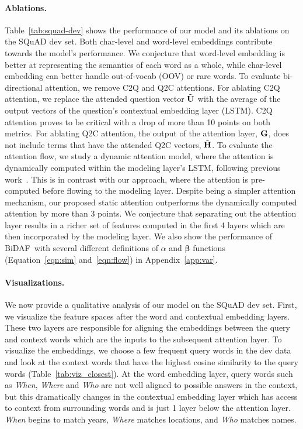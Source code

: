\documentclass{article} \usepackage{iclr2017_conference,times}
\newcommand{\sysshort}{\mbox{\sc BiDAF}}
\begin{document}
\paragraph{Ablations.} Table~\ref{tab:squad-dev} shows the performance of our model and its ablations on the SQuAD dev set. Both char-level and word-level embeddings contribute towards the model's performance. We conjecture that word-level embedding is better at representing the semantics of each word as a whole, while char-level embedding can better handle out-of-vocab (OOV) or rare words. To evaluate bi-directional attention, we remove C2Q and Q2C attentions. For ablating C2Q attention, we replace the attended question vector $\tilde{\bf U}$ with the average of the output vectors of the question's contextual embedding layer (LSTM). C2Q attention proves to be critical with a drop of more than 10 points on both metrics. For ablating Q2C attention, the output of the attention layer, ${\bf G}$, does not include terms that have the attended Q2C vectors, $\tilde{\bf H}$. To evaluate the attention flow, we study a dynamic attention model, where the attention is dynamically computed within the modeling layer's LSTM, following previous work~\citep{Bahdanau2014NeuralMT,wang2016machine}. This is in contrast with our approach, where the attention is pre-computed before flowing to the modeling layer. Despite being a simpler attention mechanism, our proposed static attention outperforms the dynamically computed attention by more than 3 points. We conjecture that separating out the attention layer results in a richer set of features computed in the first 4 layers which are then incorporated by the modeling layer.
We also show the performance of \sysshort\ with several different definitions of $\alpha$ and ${\bm \beta}$ functions (Equation~\ref{eqn:sim} and~\ref{eqn:flow}) in Appendix~\ref{app:var}.

\paragraph{Visualizations.} We now provide a qualitative analysis of our model on the SQuAD dev set. First, we visualize the feature spaces after the word and contextual embedding layers. These two layers are responsible for aligning the embeddings between the query and context words which are the inputs to the subsequent attention layer. To visualize the embeddings, we choose a few frequent query words in the dev data and look at the context words that have the highest cosine similarity to the query words (Table~\ref{tab:viz_closest}). At the word embedding layer, query words such as \textit{When}, \textit{Where} and \textit{Who} are not well aligned to possible answers in the context, but this dramatically changes in the contextual embedding layer which has access to context from surrounding words and is just 1 layer below the attention layer. \textit{When} begins to match years, \textit{Where} matches locations, and \textit{Who} matches names. 
\end{document}
